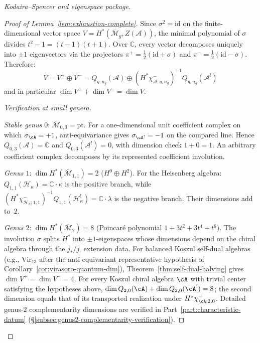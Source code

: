 \begin{proof}[Kodaira--Spencer and eigenspace package]
\begin{proof}[Proof of Lemma~\ref{lem:exhaustion-complete}]
Since $\sigma^2 = \mathrm{id}$ on the finite-dimensional vector space
$V = H^*(\overline{\mathcal{M}}_g, Z(\mathcal{A}))$, the minimal polynomial of
$\sigma$ divides $t^2 - 1 = (t-1)(t+1)$. Over $\mathbb{C}$, every vector decomposes
uniquely into $\pm 1$ eigenvectors via the projectors
$\pi^+ = \frac{1}{2}(\mathrm{id} + \sigma)$ and
$\pi^- = \frac{1}{2}(\mathrm{id} - \sigma)$. Therefore:
\begin{equation}
V = V^+ \oplus V^-
=Q_{g,n_g}(\mathcal{A})\oplus
(H^*\chi^-_{\mathcal A;g,n_g})^{-1}Q_{g,n_g}(\mathcal{A}^!)
\end{equation}
and in particular $\dim V^+ + \dim V^- = \dim V$.

\emph{Verification at small genera.}

\emph{Stable genus $0$}: $\overline{\mathcal{M}}_{0,3}=\mathrm{pt}$.
For a one-dimensional unit coefficient complex on which
\(\sigma_{\cA}=+1\), anti-equivariance gives
\(\sigma_{\cA^!}=-1\) on the compared line.  Hence
$Q_{0,3}(\mathcal{A})=\mathbb C$ and
$Q_{0,3}(\mathcal{A}^!)=0$, with dimension check $1+0=1$.
An arbitrary coefficient complex decomposes by its represented
coefficient involution.

\emph{Genus $1$}: $\dim H^*(\overline{\mathcal{M}}_{1,1}) = 2$ ($H^0 \oplus H^2$).
For the Heisenberg algebra:
$Q_{1,1}(\mathcal{H}_\kappa)=\mathbb{C}\cdot\kappa$ is the
positive branch, while
$(H^*\chi^-_{\mathcal H_\kappa;1,1})^{-1}
Q_{1,1}(\mathcal{H}_\kappa^!)=\mathbb{C}\cdot\lambda$ is the negative
branch.  Their dimensions add to~$2$.

\emph{Genus $2$}: $\dim H^*(\overline{\mathcal{M}}_2) = 8$
(Poincar\'e polynomial $1 + 3t^2 + 3t^4 + t^6$).
The involution $\sigma$ splits $H^*$ into $\pm 1$-eigenspaces whose
dimensions depend on the chiral algebra through the $j_*/j_!$ extension
data. For balanced Koszul self-dual algebras (e.g.,
$\mathrm{Vir}_{13}$ after the anti-equivariant representative
hypothesis of Corollary~\ref{cor:virasoro-quantum-dim}),
Theorem~\ref{thm:self-dual-halving} gives
$\dim V^+ = \dim V^- = 4$. For every Koszul chiral algebra
$\cA$ with trivial center satisfying the hypotheses above,
$\dim Q_{2,0}(\cA)+\dim Q_{2,0}(\cA^!)=8$; the second dimension
equals that of its transported realization under
$H^*\chi^-_{\cA;2,0}$.
Detailed genus-$2$ complementarity dimensions are verified in
Part~\ref{part:characteristic-datum} (\S\ref{subsec:genus2-complementarity-verification}).
\end{proof}


\end{proof}
